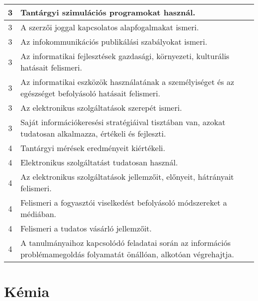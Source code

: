 \begin{longtable}{c | p{} }
                                
                                          3 &  Tantárgyi szimulációs programokat használ. \\ \hline
                                          3 &  A szerzői joggal kapcsolatos alapfogalmakat ismeri. \\ \hline
                                          3 &  Az infokommunikációs publikálási szabályokat ismeri. \\ \hline
                                          3 &  Az informatikai fejlesztések gazdasági, környezeti, kulturális hatásait felismeri. \\ \hline
                                          3 &  Az informatikai eszközök használatának a személyiséget és az egészséget befolyásoló hatásait felismeri. \\ \hline
                                          3 &  Az elektronikus szolgáltatások szerepét ismeri. \\ \hline
                                          3 &  Saját információkeresési stratégiáival tisztában van, azokat tudatosan alkalmazza, értékeli és fejleszti. \\ \hline
                                      
                                
                                          4 &  Tantárgyi mérések eredményeit kiértékeli. \\ \hline
                                          4 &  Elektronikus szolgáltatást tudatosan használ. \\ \hline
                                          4 &  Az elektronikus szolgáltatások jellemzőit, előnyeit, hátrányait felismeri. \\ \hline
                                          4 &  Felismeri a fogyasztói viselkedést befolyásoló módszereket a médiában. \\ \hline
                                          4 &  Felismeri a tudatos vásárló jellemzőit. \\ \hline
                                          4 &  A tanulmányaihoz kapcsolódó feladatai során az információs problémamegoldás folyamatát önállóan, alkotóan végrehajtja. \\ \hline
                                      
                        \end{longtable}
            \clearpage

        \section{Kémia}

